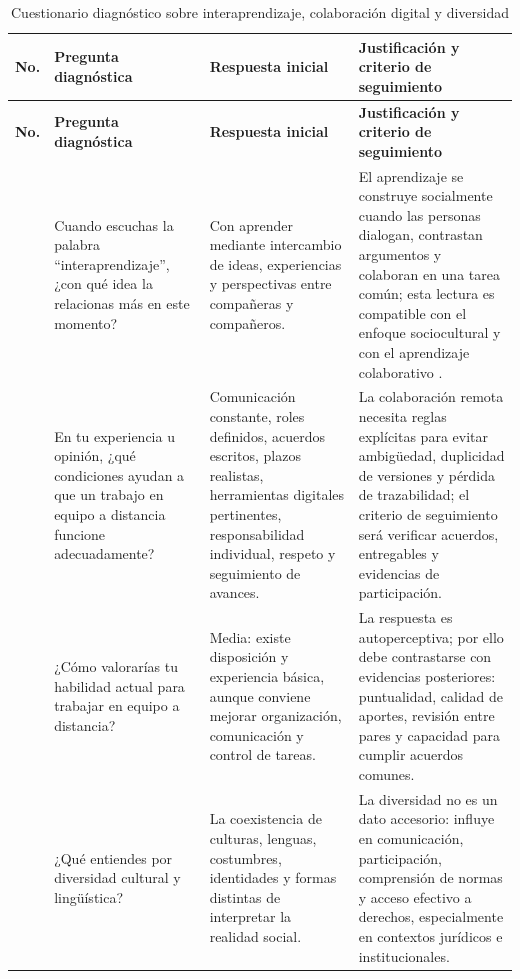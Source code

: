\documentclass[
  spanish,
  letterpaper, oneside
]{article}
\begin{document}
\begingroup
\scriptsize
\setlength{\tabcolsep}{3.2pt}
\renewcommand{\arraystretch}{1.28}
\begin{longtable}{@{}>{\centering\arraybackslash}p{}>{\raggedright\arraybackslash}p{}>{\raggedright\arraybackslash}p{}>{\raggedright\arraybackslash}p{}@{}}
\caption{Cuestionario diagnóstico sobre interaprendizaje, colaboración digital y diversidad}\label{tab:cuestionario-interaprendizaje}\\
\toprule
\textbf{No.} & \textbf{Pregunta diagnóstica} & \textbf{Respuesta inicial} & \textbf{Justificación y criterio de seguimiento} \\
\midrule
\endfirsthead
\toprule
\textbf{No.} & \textbf{Pregunta diagnóstica} & \textbf{Respuesta inicial} & \textbf{Justificación y criterio de seguimiento} \\
\midrule
\endhead
\bottomrule
\endfoot
\bottomrule
\endlastfoot
\midrule
1 & Cuando escuchas la palabra ``interaprendizaje'', ¿con qué idea la relacionas más en este momento? & Con aprender mediante intercambio de ideas, experiencias y perspectivas entre compañeras y compañeros. & El aprendizaje se construye socialmente cuando las personas dialogan, contrastan argumentos y colaboran en una tarea común; esta lectura es compatible con el enfoque sociocultural y con el aprendizaje colaborativo \citep{vygotsky1978mind,johnsonJohnson1999learning}. \\
\midrule
2 & En tu experiencia u opinión, ¿qué condiciones ayudan a que un trabajo en equipo a distancia funcione adecuadamente? & Comunicación constante, roles definidos, acuerdos escritos, plazos realistas, herramientas digitales pertinentes, responsabilidad individual, respeto y seguimiento de avances. & La colaboración remota necesita reglas explícitas para evitar ambigüedad, duplicidad de versiones y pérdida de trazabilidad; el criterio de seguimiento será verificar acuerdos, entregables y evidencias de participación. \\
\midrule
3 & ¿Cómo valorarías tu habilidad actual para trabajar en equipo a distancia? & Media: existe disposición y experiencia básica, aunque conviene mejorar organización, comunicación y control de tareas. & La respuesta es autoperceptiva; por ello debe contrastarse con evidencias posteriores: puntualidad, calidad de aportes, revisión entre pares y capacidad para cumplir acuerdos comunes. \\
\midrule
4 & ¿Qué entiendes por diversidad cultural y lingüística? & La coexistencia de culturas, lenguas, costumbres, identidades y formas distintas de interpretar la realidad social. & La diversidad no es un dato accesorio: influye en comunicación, participación, comprensión de normas y acceso efectivo a derechos, especialmente en contextos jurídicos e institucionales. \\

\end{longtable}
\end{document}
